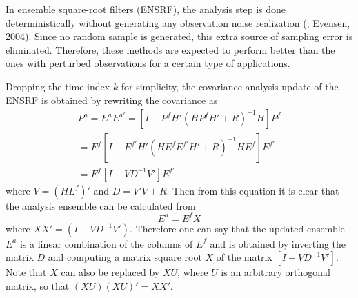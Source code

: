 In ensemble square-root filters (ENSRF), the analysis step is done
deterministically without generating any observation noise realization
(\cite{Tippettetal2003}; Evensen, 2004). Since no random sample is generated,
this extra source of sampling error is eliminated. Therefore, these methods are
expected to perform better than the ones with perturbed observations for a
certain type of applications.

Dropping the time index $k$ for simplicity, the covariance analysis update of
the ENSRF is obtained by rewriting the covariance as
\begin{eqnarray}
  P^a = E^a E^{a'}=[I-P^f H'(H P^f H' + R)^{-1} H]P^f \\
  = E^f[I-E^{f'}H'(HE^f E^{f'}H'+R)^{-1}HE^f] E^{f'} \\
  = E^f [I- V D^{-1} V'] E^{f'}
\end{eqnarray}
where $V=(HL^f)'$ and $D=V' V + R$. Then from this equation it is clear that
the analysis ensemble can be calculated from
\begin{equation}
  \label{eq.ENSRF_EX}
  E^a = E^f X
\end{equation}
where $X X'=(I-V D^{-1} V')$. Therefore one can say that the updated ensemble
$E^a$ is a linear combination of the columns of $E^f$ and is obtained by
inverting the matrix $D$ and computing a matrix square root $X$ of the matrix
$[I- V D^{-1} V']$. Note that $X$ can also be replaced by $XU$, where $U$ is an
arbitrary orthogonal matrix, so that $(XU)(XU)'=XX'$.

